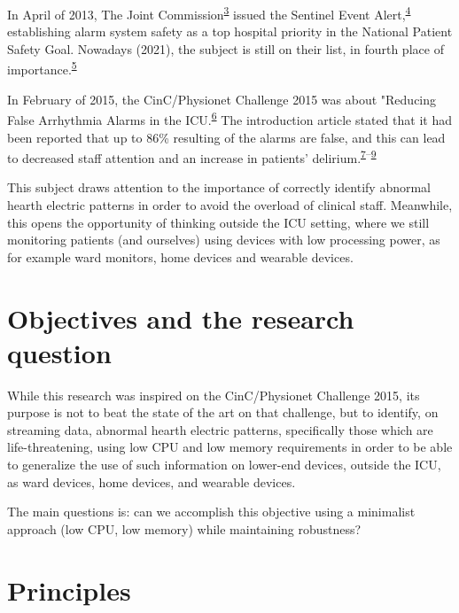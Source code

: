 \documentclass[12pt,twoside]{fmupthesis}
\begin{document}
In April of 2013, The Joint Commission\textsuperscript{\protect\hyperlink{ref-the_jc}{3}} issued the Sentinel Event Alert,\textsuperscript{\protect\hyperlink{ref-JointCommission2013}{4}} establishing alarm system safety as a top hospital priority in the National
Patient Safety Goal. Nowadays (2021), the subject is still on their list, in fourth place of
importance.\textsuperscript{\protect\hyperlink{ref-the_jc2021}{5}}

In February of 2015, the CinC/Physionet Challenge 2015 was about "Reducing False Arrhythmia Alarms
in the ICU.\textsuperscript{\protect\hyperlink{ref-Clifford2015}{6}} The introduction article stated that it had been reported that up to 86\%
resulting of the alarms are false, and this can lead to decreased staff attention and an increase in
patients' delirium.\textsuperscript{\protect\hyperlink{ref-Lawless1994}{7}--\protect\hyperlink{ref-Parthasarathy2004}{9}}

This subject draws attention to the importance of correctly identify abnormal hearth electric patterns
in order to avoid the overload of clinical staff. Meanwhile, this opens the opportunity of thinking
outside the ICU setting, where we still monitoring patients (and ourselves) using devices with
low processing power, as for example ward monitors, home devices and wearable devices.

\hypertarget{objectives-and-the-research-question}{%
\chapter{Objectives and the research question}\label{objectives-and-the-research-question}}

While this research was inspired on the CinC/Physionet Challenge 2015, its purpose is not to beat
the state of the art on that challenge, but to identify, on streaming data, abnormal hearth electric
patterns, specifically those which are life-threatening, using low CPU and low memory requirements
in order to be able to generalize the use of such information on lower-end devices, outside the ICU,
as ward devices, home devices, and wearable devices.

The main questions is: can we accomplish this objective using a minimalist approach (low CPU, low
memory) while maintaining robustness?

\hypertarget{principles}{%
\chapter{Principles}\label{principles}}
\end{document}
